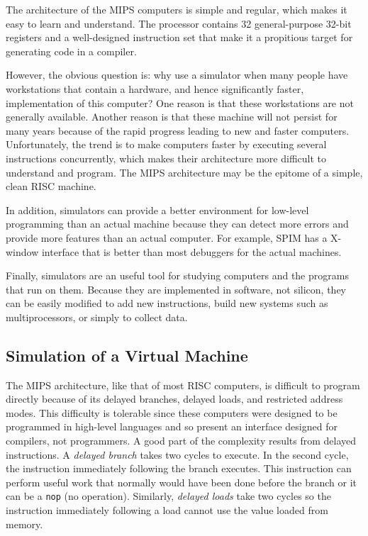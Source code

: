 \documentclass[11pt]{article}
\begin{document}
The architecture of the MIPS computers is simple and regular, which
makes it easy to learn and understand.  The processor contains 32
general-purpose 32-bit registers and a well-designed instruction set that
make it a propitious target for generating code in a compiler.

However, the obvious question is: why use a simulator when many people
have workstations that contain a hardware, and hence significantly
faster, implementation of this computer?  One reason is that these
workstations are not generally available.  Another reason is that
these machine will not persist for many years because of the rapid
progress leading to new and faster computers.  Unfortunately, the
trend is to make computers faster by executing several instructions
concurrently, which makes their architecture more difficult to
understand and program.  The MIPS architecture may be the epitome of a
simple, clean RISC machine.

In addition, simulators can provide a better environment for low-level
programming than an actual machine because they can detect more errors
and provide more features than an actual computer.  For example, SPIM
has a X-window interface that is better than most debuggers for the
actual machines.

Finally, simulators are an useful tool for studying computers and the
programs that run on them.  Because they are implemented in software,
not silicon, they can be easily modified to add new instructions,
build new systems such as multiprocessors, or simply to collect data.

\subsection{Simulation of a Virtual Machine}

The MIPS architecture, like that of most RISC computers, is difficult
to program directly because of its delayed branches, delayed loads,
and restricted address modes.  This difficulty is tolerable since
these computers were designed to be programmed in high-level languages
and so present an interface designed for compilers, not programmers.
A good part of the complexity results from delayed instructions.  A
{\em delayed branch\/} takes two cycles to execute.  In the second
cycle, the instruction immediately following the branch executes.
This instruction can perform useful work that normally would have been
done before the branch or it can be a {\tt nop} (no operation).
Similarly, {\em delayed loads\/} take two cycles so the instruction
immediately following a load cannot use the value loaded from memory.
\end{document}
